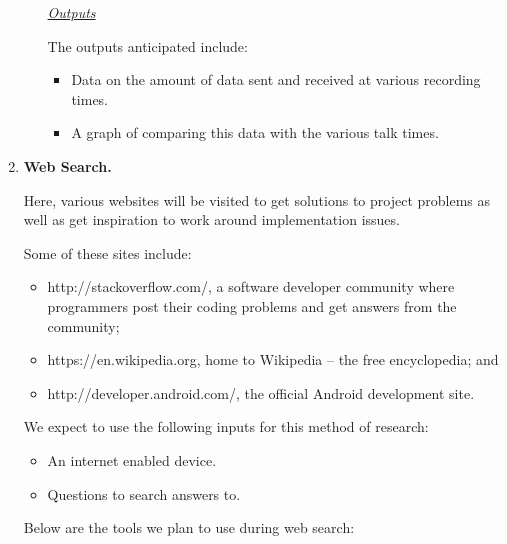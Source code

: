 \documentclass[12pt,svgnames,smaller]{article} %
\begin{document}
\begin{enumerate}
\begin{enumerate}
\begin{enumerate}
			\end{enumerate}
			
			\emph{\underline{\textsf{Outputs}}}

			The outputs anticipated include:

			\begin{itemize}
				\item Data on the amount of data sent and received at various recording times.
				\item A graph of comparing this data with the various talk times. 
			\end{itemize}
			
			
		\end{enumerate}
				

		
		\item \textbf{Web Search.}

		Here, various websites will be visited to get solutions to project problems as well as get inspiration to work around implementation issues.
		
		Some of these sites include:
		
		\begin{itemize}
			\item http://stackoverflow.com/, a software developer community where programmers post their coding problems and get answers from the community;
			\item https://en.wikipedia.org, home to Wikipedia –  the free encyclopedia; and
			\item http://developer.android.com/, the official Android development site.
		\end{itemize}
		
		We expect to use the following inputs for this method of research:
		
		\begin{itemize}
			\item An internet enabled device.
			\item Questions to search answers to.
		\end{itemize}
		
		Below are the tools we plan to use during web search:
		

\end{enumerate}
\end{document}
